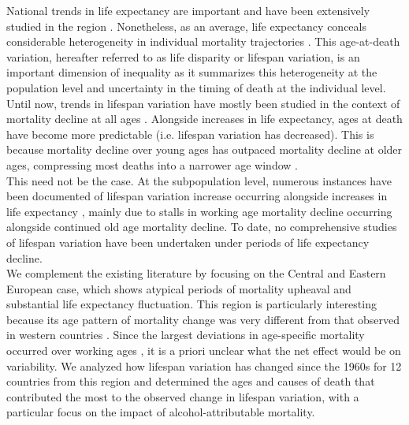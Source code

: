 \documentclass{article}
\begin{document}
\begin{spacing}{1.5}
National trends in life expectancy are important and have been extensively studied in the region \citep{mesle2004mortality, mesle2000, rychtarikova2004,shkolnikov2001,shkolnikov2006changing,leon2011}. Nonetheless, as an average, life expectancy conceals considerable heterogeneity in individual mortality trajectories \citep{edwards2005, wilmoth1999}. This age-at-death variation, hereafter referred to as life disparity or lifespan variation, is an important dimension of inequality as it summarizes \textcolor[rgb]{1,0,0}{this heterogeneity at the population level and uncertainty in the timing of death at the individual level}. Until now, trends in lifespan variation have mostly been studied in the context of mortality decline at all ages \citep{edwards2005,smits2009,vaupel2011}. Alongside increases in life expectancy, ages at death have become more predictable (i.e. lifespan variation has decreased). This is because mortality decline over young ages has outpaced mortality decline at older ages, compressing most deaths into a narrower age window \citep{vaupel2011}.\\

This need not be the case. At the subpopulation level, numerous instances have been documented of lifespan variation increase occurring alongside increases in life expectancy \citep{vanraalte2014,sasson2016trends,seaman2016increasing, bronnum-hansen2017}, mainly due to stalls in working age mortality decline occurring alongside continued old age mortality decline. To date, no comprehensive studies of lifespan variation have been undertaken under periods of life expectancy decline.\\

We complement the existing literature by focusing on the Central and Eastern European case, which shows atypical periods of mortality upheaval and substantial life expectancy fluctuation. This region is particularly interesting because its age pattern of mortality change was very different from that observed in western countries \citep{mesle2004mortality}. Since the \textcolor[rgb]{1,0,0}{largest deviations} in age-specific mortality occurred over working ages \citep{rehm2007}, it is a priori unclear what the net effect would be on variability. We analyzed how lifespan variation has changed since the 1960s for 12 countries from this region and determined the ages and causes of death that contributed the most to the observed change in lifespan variation, with a particular focus on the impact of alcohol-attributable mortality. 
%



\end{spacing}
\end{document}
